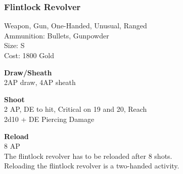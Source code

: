 \subsubsection{Flintlock Revolver}\label{weapon:flintlockRevolver}
Weapon, Gun, One-Handed, Unusual, Ranged\\
Ammunition: Bullets, Gunpowder\\
Size: S\\
Cost: 1800 Gold

\textbf{Draw/Sheath} \\
2AP draw, 4AP sheath

\textbf{Shoot} \\
2 AP, DE to hit, Critical on 19 and 20,  Reach\\
2d10 + DE Piercing Damage

\textbf{Reload} \\
8 AP\\
The flintlock revolver has to be reloaded after 8 shots.\\
Reloading the flintlock revolver is a two-handed activity.

